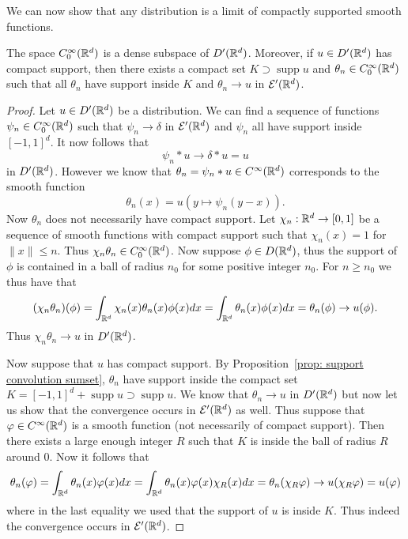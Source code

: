 \documentclass[twoside, a4paper, 10pt]{amsart}
\begin{document}
We can now show that any distribution is a limit of compactly supported smooth functions.

\begin{thm} \label{thm: approximate distribution by functions} The space $C_0^{\infty}(\mathbb{R}^d)$ is a dense subspace of $D'(\mathbb{R}^d)$. Moreover, if $u \in D'(\mathbb{R}^d)$ has compact support, then there exists a compact set $K \supset \operatorname{supp} u$ and $\theta_n \in C_0^{\infty}(\mathbb{R}^d)$  such that all $\theta_n$ have support inside $K$ and $\theta_n \to u$ in $\mathcal{E}'(\mathbb{R}^d)$.

\end{thm}

\begin{proof} Let $u \in D'(\mathbb{R}^d)$ be a distribution. We can find a sequence of functions $\psi_n \in C_0^{\infty}(\mathbb{R}^d)$ such that $\psi_n \to \delta$ in $\mathcal{E}'(\mathbb{R}^d)$ and $\psi_n$ all have support inside $[-1,1]^d$. It now follows that $$\psi_n * u \to \delta * u = u$$ in $D'(\mathbb{R}^d)$. However we know that $\theta_n = \psi_n * u \in C^{\infty}(\mathbb{R}^d)$ corresponds to the smooth function $$\theta_n(x) = u(y \mapsto \psi_n(y-x)).$$ Now $\theta_n$ does not necessarily have compact support. Let $\chi_n:\mathbb{R}^d \to [0,1]$ be a sequence of smooth functions with compact support such that $\chi_n(x)=1$ for $\|x \| \leq n$. Thus $\chi_n \theta_n \in C_0^{\infty}(\mathbb{R}^d)$. Now suppose $\phi \in D(\mathbb{R}^d)$, thus the support of $\phi$ is contained in a ball of radius $n_0$ for some positive integer $n_0$. For $n\geq n_0$ we thus have that $$(\chi_n\theta_n) (\phi) = \int_{\mathbb{R}^d} \chi_n(x) \theta_n(x) \phi(x) dx = \int_{\mathbb{R}^d} \theta_n(x)\phi(x) dx = \theta_n(\phi) \to u(\phi). $$ Thus $\chi_n \theta_n \to u$ in $D'(\mathbb{R}^d)$.

Now suppose that $u$ has compact support. By Proposition~\ref{prop: support convolution sumset}, $\theta_n$ have support inside the compact set $K =  [-1,1]^d + \operatorname{supp} u \supset \operatorname{supp} u$. We know that $\theta_n \to u$ in $D'(\mathbb{R}^d)$ but now let us show that the convergence occurs in $\mathcal{E}'(\mathbb{R}^d)$ as well. Thus suppose that $\varphi \in C^{\infty}(\mathbb{R}^d)$ is a smooth function (not necessarily of compact support). Then there exists a large enough integer $R$ such that $K$ is inside the ball of radius $R$ around $0$. Now it follows that $$\theta_n(\varphi) = \int_{\mathbb{R}^d} \theta_n(x)\varphi(x) dx = \int_{\mathbb{R}^d} \theta_n(x)\varphi(x)\chi_R(x) dx = \theta_n(\chi_R \varphi) \to u(\chi_R\varphi) = u(\varphi) $$ where in the last equality we used that the support of $u$ is inside $K$. Thus indeed the convergence occurs in $\mathcal{E}'(\mathbb{R}^d)$. \end{proof}
\end{document}
